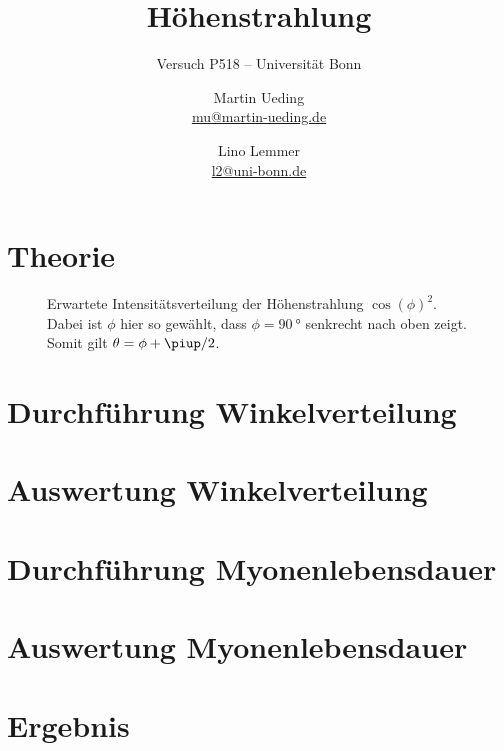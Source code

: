 \documentclass[11pt, ngerman, fleqn, DIV=15, headinclude, BCOR=2cm]{scrreprt}
\title{Höhenstrahlung}
\subtitle{Versuch P518 -- Universität Bonn}
\author{
    Martin Ueding \\ \small{\href{mailto:mu@martin-ueding.de}{mu@martin-ueding.de}}
    \and
    Lino Lemmer \\
    \small{\href{mailto:l2@uni-bonn.de}{l2@uni-bonn.de}}
}
\date{\daterange{2014-07-02}{2014-07-03}}
\begin{document}
\maketitle

\begin{abstract}
\end{abstract}

\tableofcontents

\chapter{Theorie}

\begin{figure}[htbp]
    \centering
    \caption{%
        Erwartete Intensitätsverteilung der Höhenstrahlung $\cos(\phi)^2$.
        Dabei ist $\phi$ hier so gewählt, dass $\phi = \SI{90}{\degree}$
        senkrecht nach oben zeigt. Somit gilt $\theta = \phi + \piup/2$.
    }
    \label{fig:cos2}
\end{figure}

\chapter{Durchführung Winkelverteilung}

\chapter{Auswertung Winkelverteilung}

\chapter{Durchführung Myonenlebensdauer}

\chapter{Auswertung Myonenlebensdauer}

\chapter{Ergebnis}
\end{document}
